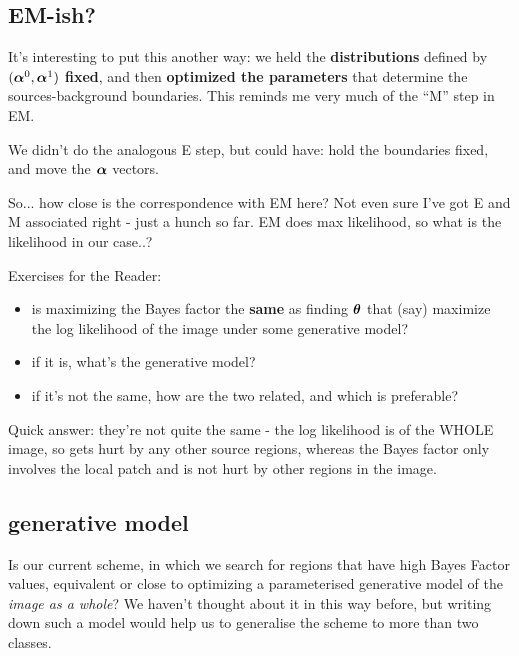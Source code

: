 \documentclass[12pt]{article}
\newcommand{\balpha}{\mbox{\boldmath $\alpha$}}
\newcommand{\btheta}{\mbox{\boldmath $\theta$}}
\begin{document}
\subsection{EM-ish?}

It's interesting to put this another way: we held the {\bf
  distributions} defined by $(\balpha^0,\balpha^1)$ {\bf fixed}, and
then {\bf optimized the parameters} that determine the
sources-background boundaries.  This reminds me very much of the ``M''
step in EM.

We didn't do the analogous E step, but could have: hold the
boundaries fixed, and move the $\balpha$ vectors.

So... how close is the correspondence with EM here? Not even sure I've
got E and M associated right - just a hunch so far. EM does max likelihood, so what is the likelihood in our case..?

Exercises for the Reader:
\begin{itemize}
\item is maximizing the Bayes factor the {\bf same} as finding
  $\btheta$ that (say) maximize the log likelihood of the image under
  some generative model? 
\item if it is, what's the generative model?
\item if it's not the same, how are the two related, and which is preferable?
\end{itemize}

Quick answer: they're not quite the same - the log likelihood is of
the WHOLE image, so gets hurt by any other source regions, whereas the
Bayes factor only involves the local patch and is not hurt by other
regions in the image.


\subsection{generative model}
Is our current scheme, in which we search for regions that have high
Bayes Factor values, equivalent or close to optimizing a parameterised
generative model of the \emph{image as a whole}? We haven't thought about it
in this way before, but writing down such a model would help us to
generalise the scheme to more than two classes.
\end{document}
